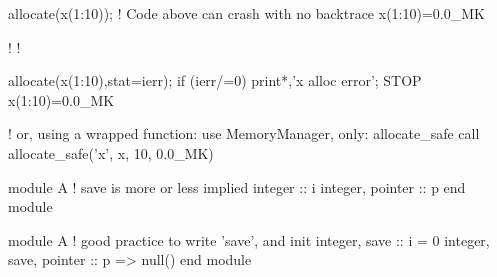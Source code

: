 \documentclass{article}
\begin{document}
\begin{codea}
allocate(x(1:10));
! Code above can crash with no backtrace
x(1:10)=0.0_MK


! 
! 
\end{codea} 
\begin{codeb}
allocate(x(1:10),stat=ierr); 
if (ierr/=0) print*,'x alloc error'; STOP
x(1:10)=0.0_MK

! or, using a wrapped function:
use MemoryManager, only: allocate_safe
call allocate_safe('x', x, 10, 0.0_MK)
\end{codeb}

\begin{codea}
module A
    ! save is more or less implied
    integer :: i
    integer, pointer :: p
end module
\end{codea} 
\begin{codeb}
module A
    ! good practice to write 'save', and init
    integer, save          :: i = 0
    integer, save, pointer :: p => null()
end module
\end{codeb}
\end{document}
